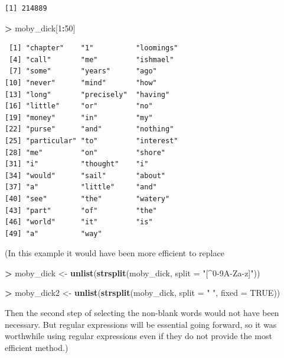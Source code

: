 \documentclass[]{krantz}
\makeatletter
\newenvironment{Shaded}{\begin{snugshade}}{\end{snugshade}}
\newcommand{\DataTypeTok}[1]{\textcolor[rgb]{0.27,0.27,0.27}{#1}}
\newcommand{\DecValTok}[1]{\textcolor[rgb]{0.06,0.06,0.06}{#1}}
\newcommand{\KeywordTok}[1]{\textcolor[rgb]{0.27,0.27,0.27}{\textbf{#1}}}
\newcommand{\NormalTok}[1]{#1}
\newcommand{\OperatorTok}[1]{\textcolor[rgb]{0.43,0.43,0.43}{\textbf{#1}}}
\newcommand{\OtherTok}[1]{\textcolor[rgb]{0.37,0.37,0.37}{#1}}
\newcommand{\StringTok}[1]{\textcolor[rgb]{0.5,0.5,0.5}{#1}}
\newenvironment{kframe}{%
\medskip{}
\setlength{\fboxsep}{.8em}
 \def\at@end@of@kframe{}%
 \ifinner\ifhmode%
  \def\at@end@of@kframe{\end{minipage}}%
  \begin{minipage}{\columnwidth}%
 \fi\fi%
 \def\FrameCommand##1{\hskip\@totalleftmargin \hskip-\fboxsep
 \colorbox{shadecolor}{##1}\hskip-\fboxsep
     \hskip-\linewidth \hskip-\@totalleftmargin \hskip\columnwidth}%
 \MakeFramed {\advance\hsize-\width
   \@totalleftmargin\z@ \linewidth\hsize
   \@setminipage}}%
 {\par\unskip\endMakeFramed%
 \at@end@of@kframe}
\renewenvironment{Shaded}{\begin{kframe}}{\end{kframe}}
\makeatother
\begin{document}
\begin{verbatim}
[1] 214889
\end{verbatim}

\begin{Shaded}
\begin{Highlighting}[]
\OperatorTok{>}\StringTok{ }\NormalTok{moby_dick[}\DecValTok{1}\OperatorTok{:}\DecValTok{50}\NormalTok{]}
\end{Highlighting}
\end{Shaded}

\begin{verbatim}
 [1] "chapter"    "1"          "loomings"  
 [4] "call"       "me"         "ishmael"   
 [7] "some"       "years"      "ago"       
[10] "never"      "mind"       "how"       
[13] "long"       "precisely"  "having"    
[16] "little"     "or"         "no"        
[19] "money"      "in"         "my"        
[22] "purse"      "and"        "nothing"   
[25] "particular" "to"         "interest"  
[28] "me"         "on"         "shore"     
[31] "i"          "thought"    "i"         
[34] "would"      "sail"       "about"     
[37] "a"          "little"     "and"       
[40] "see"        "the"        "watery"    
[43] "part"       "of"         "the"       
[46] "world"      "it"         "is"        
[49] "a"          "way"       
\end{verbatim}

(In this example it would have been more efficient to replace

\begin{Shaded}
\begin{Highlighting}[]
\OperatorTok{>}\StringTok{ }\NormalTok{moby_dick <-}\StringTok{ }\KeywordTok{unlist}\NormalTok{(}\KeywordTok{strsplit}\NormalTok{(moby_dick, }\DataTypeTok{split =} \StringTok{"[^0-9A-Za-z]"}\NormalTok{))}
\end{Highlighting}
\end{Shaded}

\begin{Shaded}
\begin{Highlighting}[]
\OperatorTok{>}\StringTok{ }\NormalTok{moby_dick2 <-}\StringTok{ }\KeywordTok{unlist}\NormalTok{(}\KeywordTok{strsplit}\NormalTok{(moby_dick, }\DataTypeTok{split =} \StringTok{" "}\NormalTok{, }\DataTypeTok{fixed =} \OtherTok{TRUE}\NormalTok{))}
\end{Highlighting}
\end{Shaded}

Then the second step of selecting the non-blank words would not have been necessary. But regular expressions will be essential going forward, so it was worthwhile using regular expressions even if they do not provide the most efficient method.)
\end{document}
